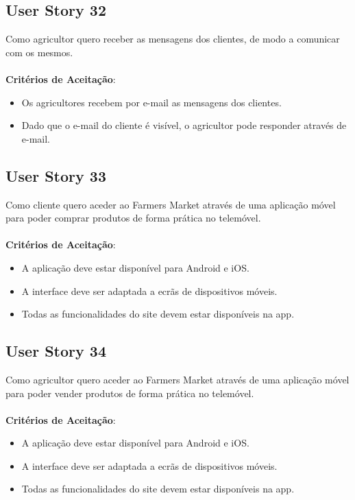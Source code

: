 \documentclass[a4paper,11pt]{article}
\begin{document}
\subsection{User Story 32}
Como agricultor quero receber as mensagens dos clientes, de modo a comunicar com os mesmos.\\\\
\textbf{Critérios de Aceitação}:
\begin{itemize}
  \item Os agricultores recebem por e-mail as mensagens dos clientes.
  \item Dado que o e-mail do cliente é visível, o agricultor pode responder através de e-mail.
\end{itemize}
\subsection{User Story 33}
Como cliente quero aceder ao Farmers Market através de uma aplicação móvel para poder comprar produtos de forma prática no telemóvel.\\\\
\textbf{Critérios de Aceitação}:
\begin{itemize}
  \item A aplicação deve estar disponível para Android e iOS.
  \item A interface deve ser adaptada a ecrãs de dispositivos móveis.
  \item Todas as funcionalidades do site devem estar disponíveis na app.
\end{itemize}
\subsection{User Story 34}
Como agricultor quero aceder ao Farmers Market através de uma aplicação móvel para poder vender produtos de forma prática no telemóvel.\\\\
\textbf{Critérios de Aceitação}:
\begin{itemize}
  \item A aplicação deve estar disponível para Android e iOS.
  \item A interface deve ser adaptada a ecrãs de dispositivos móveis.
  \item Todas as funcionalidades do site devem estar disponíveis na app.
\end{itemize}
\end{document}

